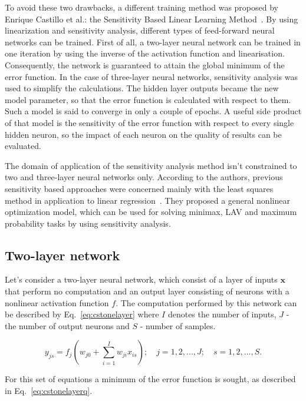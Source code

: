 \documentclass[]{spie}  %
\newcommand{\bm}[1]{\boldsymbol{#1}}
\begin{document}
To avoid these two drawbacks, a different training method was proposed by Enrique Castillo et al.: the Sensitivity Based Linear Learning Method~\cite{castillo2006very}. By using linearization and sensitivity analysis, different types of feed-forward neural networks can be trained. First of all, a two-layer neural network can be trained in one iteration by using the inverse of the activation function and linearisation. Consequently, the network is guaranteed to attain the global minimum of the error function. In the case of three-layer neural networks, sensitivity analysis was used to simplify the calculations. The hidden layer outputs became the new model parameter, so that the error function is calculated with respect to them. Such a model is said to converge in only a couple of epochs. A useful side product of that model is the sensitivity of the error function with respect to every single hidden neuron, so the impact of each neuron on the quality of results can be evaluated.

The domain of application of the sensitivity analysis method isn't constrained to two and three-layer neural networks only. According to the authors, previous sensitivity based approaches were concerned mainly with the least squares method in application to linear regression~\cite{castillo2004general}. They proposed a general nonlinear optimization model, which can be used for solving minimax, LAV and maximum probability tasks by using sensitivity analysis.

\subsection{Two-layer network}
Let's consider a two-layer neural network, which consist of a layer of inputs $\bm{x}$ that perform no computation and an output layer consisting of neurons with a nonlinear activation function $f$. The computation performed by this network can be described by Eq.~\ref{eq:cstonelayer} where $I$ denotes the number of inputs, $J$ - the number of output neurons and $S$ - number of samples.

\begin{equation}
y_{js} = f_j \left( w_{j0} + \sum_{i=1}^{I}w_{ji}x_{is} \right); \quad j = 1,2,...,J; \quad s = 1,2,...,S.
\label{eq:cstonelayer}
\end{equation}

\noindent For this set of equations a minimum of the error function is sought, as described in Eq.~\ref{eq:cstonelayerq}.
\end{document}
